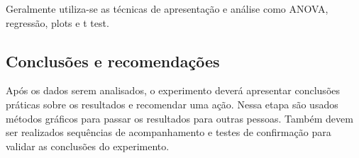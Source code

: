 Geralmente utiliza-se as técnicas de apresentação e análise como ANOVA, regressão, plots e t test.


\subsection{Conclusões e recomendações}
Após os dados serem analisados, o experimento deverá apresentar conclusões práticas sobre os resultados e recomendar uma ação. Nessa etapa são usados métodos gráficos para passar os resultados para outras pessoas. Também devem ser realizados sequências de acompanhamento e testes de confirmação para validar as conclusões do experimento. 

